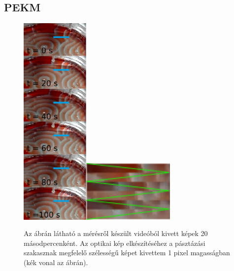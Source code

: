 \subsection{PEKM}
\begin{figure}[h!]
\centering
\includegraphics[width=0.3\textwidth]{img/pasztazas.png}\includegraphics[width=0.4\textwidth]{img/pasztazas2.png}
\caption{Az ábrán látható a mérésről készült videóból kivett képek 20 másodpercenként. Az optikai kép elkészítéséhez a pásztázási szakasznak megfelelő szélességű képet kivettem 1 pixel magasságban (kék vonal az ábrán).}
\label{fig:pasztazas}
\end{figure}

